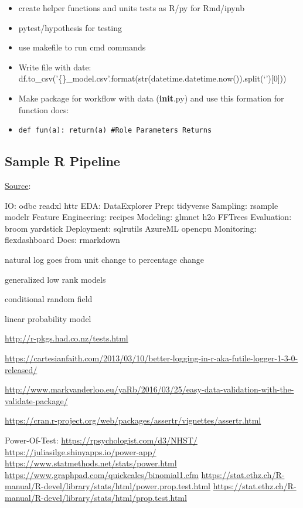 \documentclass[]{book}
\begin{document}
\begin{itemize}
\item
  create helper functions and units tests as R/py for Rmd/ipynb
\item
  pytest/hypothesis for testing
\item
  use makefile to run cmd commands
\item
  Write file with date:
  df.to\_csv('\{\}\_model.csv'.format(str(datetime.datetime.now()).split(`'){[}0{]}))
\item
  Make package for workflow with data (\textbf{init}.py) and use this
  formation for function docs:
\item
  \texttt{def\ fun(a):\ return(a)\ \#Role\ Parameters\ Returns}
\end{itemize}

\subsection{Sample R Pipeline}\label{sample-r-pipeline}

\href{https://mobile.twitter.com/TheStephLocke/status/990251709531344896}{Source}:

IO: odbc readxl httr EDA: DataExplorer Prep: tidyverse Sampling: rsample
modelr Feature Engineering: recipes Modeling: glmnet h2o FFTrees
Evaluation: broom yardstick Deployment: sqlrutils AzureML opencpu
Monitoring: flexdashboard Docs: rmarkdown

natural log goes from unit change to percentage change

generalized low rank models

conditional random field

linear probability model

\url{http://r-pkgs.had.co.nz/tests.html}

\url{https://cartesianfaith.com/2013/03/10/better-logging-in-r-aka-futile-logger-1-3-0-released/}

\url{http://www.markvanderloo.eu/yaRb/2016/03/25/easy-data-validation-with-the-validate-package/}

\url{https://cran.r-project.org/web/packages/assertr/vignettes/assertr.html}

Power-Of-Test: \url{https://rpsychologist.com/d3/NHST/}
\url{https://juliasilge.shinyapps.io/power-app/}
\url{https://www.statmethods.net/stats/power.html}
\url{https://www.graphpad.com/quickcalcs/binomial1.cfm}
\url{https://stat.ethz.ch/R-manual/R-devel/library/stats/html/power.prop.test.html}
\url{https://stat.ethz.ch/R-manual/R-devel/library/stats/html/prop.test.html}
\end{document}
